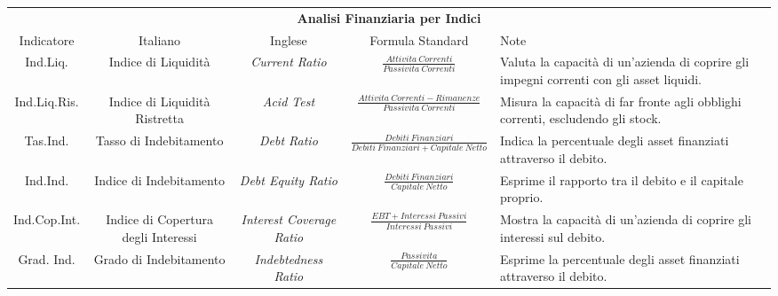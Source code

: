 \documentclass{article}
\newcommand{\ilDesc}{Valuta la capacità di un'azienda di coprire gli impegni correnti con gli asset liquidi.}
\newcommand{\ilrDesc}{Misura la capacità di far fronte agli obblighi correnti, escludendo gli stock.}
\newcommand{\tdDesc}{Indica la percentuale degli asset finanziati attraverso il debito.}
\newcommand{\iiDesc}{Esprime il rapporto tra il debito e il capitale proprio.}
\newcommand{\iciDesc}{Mostra la capacità di un'azienda di coprire gli interessi sul debito.}
\newcommand{\giDesc}{Esprime la percentuale degli asset finanziati attraverso il debito.}
\begin{document}
\begin{table}[ht]
{\begin{tabular}{|c|c|c|c|l|}
                              &                                       &                                                                   &                                                                                       &                       \\
            \hline
            \hline
            \multicolumn{5}{|c|}{\textbf{Analisi Finanziaria per Indici}}                                                                                                                                                                                 \\
            \hline
            Indicatore        & Italiano                              & Inglese                                                           & Formula Standard                                                                      & Note                  \\
            \hline
            Ind.Liq.          & Indice di Liquidità                   & \textit{Current Ratio}                                            & $\displaystyle\frac{Attivita\ Correnti}{Passivita\ Correnti}$                         & \ilDesc               \\
            Ind.Liq.Ris.      & Indice di Liquidità Ristretta         & \textit{Acid Test}                                                & $\displaystyle\frac{Attivita\ Correnti - Rimanenze}{Passivita\ Correnti}$             & \ilrDesc              \\
            Tas.Ind.          & Tasso di Indebitamento                & \textit{Debt Ratio}                                               & $\displaystyle\frac{Debiti\ Finanziari}{Debiti\ Finanziari + Capitale\ Netto}$        & \tdDesc               \\
            Ind.Ind.          & Indice di Indebitamento               & \textit{Debt Equity Ratio}                                        & $\displaystyle\frac{Debiti\ Finanziari}{Capitale\ Netto}$                             & \iiDesc               \\
            Ind.Cop.Int.      & Indice di Copertura degli Interessi   & \textit{Interest Coverage Ratio}                                  & $\displaystyle\frac{EBT + Interessi\ Passivi}{Interessi\ Passivi}$                    & \iciDesc              \\
            Grad. Ind.        & Grado di Indebitamento                & \textit{Indebtedness Ratio}                                       & $\displaystyle\frac{Passivita}{Capitale\ Netto}$                                      & \giDesc               \\

\end{tabular}}
\end{table}
\end{document}
